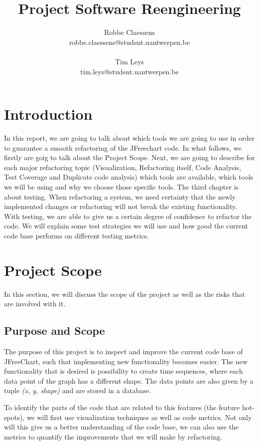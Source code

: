 \documentclass[]{article}
\title{Project Software Reengineering}
\author{Robbe Claessens \\ robbe.claessens@student.uantwerpen.be \\ \\Tim Leys\\tim.leys@student.uantwerpen.be}
\begin{document}
\maketitle



\section{Introduction}
In this report, we are going to talk about which tools we are going to use in order to guarantee a smooth refactoring of the JFreechart code. In what follows, we firstly are goig to talk about the Project Scope. Next, we are going to describe for each major refactoring topic (Visualization, Refactoring itself, Code Analysis, Test Coverage and Duplicate code analysis) which tools are available, which tools we will be using and why we choose those specific tools. The third chapter is about testing. When refactoring a system, we need certainty that the newly implemented changes or refactoring will not break the existing functionality. With testing, we are able to give us a certain degree of confidence to refactor the code. We will explain some test strategies we will use and how good the current code base performs on different testing metrics.

\section{Project Scope}

In this section, we will discuss the scope of the project as well as the risks that are involved with it.

\subsection{Purpose and Scope}
The purpose of this project is to inspect and improve the current code base of JFreeChart, such that implementing new functionality becomes easier. The new functionality that is desired is possibility to create time sequences, where each data point of the graph has a different shape. The data points are also given by a tuple \textit{(x, y, shape)} and are stored in a database. 

To identify the parts of the code that are related to this features (the feature hot-spots), we will first use visualization techniques as well as code metrics. Not only will this give us a better understanding of the code base, we can also use the metrics to quantify the improvements that we will make by refactoring.
\end{document}
